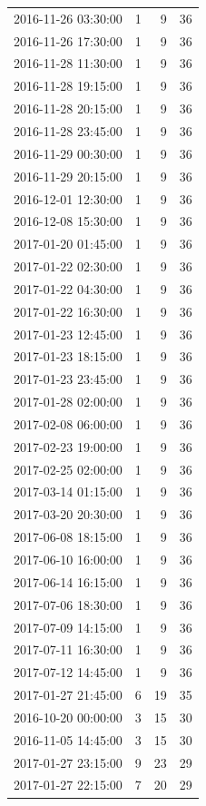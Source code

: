 \begin{tabular}{lrrr}
2016-11-26 03:30:00 & 1 & 9 & 36 \\
2016-11-26 17:30:00 & 1 & 9 & 36 \\
2016-11-28 11:30:00 & 1 & 9 & 36 \\
2016-11-28 19:15:00 & 1 & 9 & 36 \\
2016-11-28 20:15:00 & 1 & 9 & 36 \\
2016-11-28 23:45:00 & 1 & 9 & 36 \\
2016-11-29 00:30:00 & 1 & 9 & 36 \\
2016-11-29 20:15:00 & 1 & 9 & 36 \\
2016-12-01 12:30:00 & 1 & 9 & 36 \\
2016-12-08 15:30:00 & 1 & 9 & 36 \\
2017-01-20 01:45:00 & 1 & 9 & 36 \\
2017-01-22 02:30:00 & 1 & 9 & 36 \\
2017-01-22 04:30:00 & 1 & 9 & 36 \\
2017-01-22 16:30:00 & 1 & 9 & 36 \\
2017-01-23 12:45:00 & 1 & 9 & 36 \\
2017-01-23 18:15:00 & 1 & 9 & 36 \\
2017-01-23 23:45:00 & 1 & 9 & 36 \\
2017-01-28 02:00:00 & 1 & 9 & 36 \\
2017-02-08 06:00:00 & 1 & 9 & 36 \\
2017-02-23 19:00:00 & 1 & 9 & 36 \\
2017-02-25 02:00:00 & 1 & 9 & 36 \\
2017-03-14 01:15:00 & 1 & 9 & 36 \\
2017-03-20 20:30:00 & 1 & 9 & 36 \\
2017-06-08 18:15:00 & 1 & 9 & 36 \\
2017-06-10 16:00:00 & 1 & 9 & 36 \\
2017-06-14 16:15:00 & 1 & 9 & 36 \\
2017-07-06 18:30:00 & 1 & 9 & 36 \\
2017-07-09 14:15:00 & 1 & 9 & 36 \\
2017-07-11 16:30:00 & 1 & 9 & 36 \\
2017-07-12 14:45:00 & 1 & 9 & 36 \\
2017-01-27 21:45:00 & 6 & 19 & 35 \\
2016-10-20 00:00:00 & 3 & 15 & 30 \\
2016-11-05 14:45:00 & 3 & 15 & 30 \\
2017-01-27 23:15:00 & 9 & 23 & 29 \\
2017-01-27 22:15:00 & 7 & 20 & 29 \\

\end{tabular}
